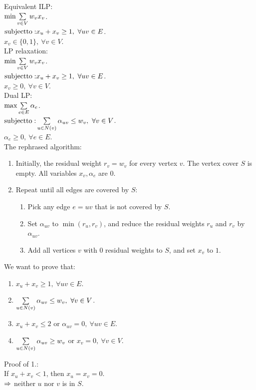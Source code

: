 \begin{pr}$ $\\
Equivalent ILP:\\
$\min\sum\limits_{v\in V}w_vx_v$.\\
$\mathrm{subject to: } x_u+x_v\geq1,\ \forall uv\in E$.\\
$x_v\in\{0, 1\},\ \forall v\in V$.\\
LP relaxation:\\
$\min\sum\limits_{v\in V}w_vx_v$.\\
$\mathrm{subject to: } x_u+x_v\geq1,\ \forall uv\in E$.\\
$x_v\geq0,\ \forall v\in V$.\\
Dual LP:\\
$\max\sum\limits_{e\in E}\alpha_e$.\\
$\subj\suml_{u\in N(v)}\alpha_{uv}\leq w_v,\ \forall v\in V$.\\
$\alpha_e\geq0,\ \forall e\in E$.\\
The rephrased algorithm:
\begin{enumerate}
\item Initially, the residual weight $r_v=w_v$ for every vertex $v$. The vertex cover $S$ is empty. All variables $x_v, \alpha_e$ are $0$.
\item Repeat until all edges are covered by $S$:
\begin{enumerate}
\item Pick any edge $e=uv$ that is not covered by $S$.
\item Set $\alpha_{uv}$ to $\min(r_u, r_v)$, and reduce the residual weights $r_u$ and $r_v$ by $\alpha_{uv}$.
\item Add all vertices $v$ with $0$ residual weights to $S$, and set $x_v$ to $1$.
\end{enumerate}
\end{enumerate}
We want to prove that:
\begin{enumerate}
\item $x_u+x_v\geq1,\ \forall uv\in E$.
\item $\suml_{u\in N(v)}\alpha_{uv}\leq w_v,\ \forall v\in V$.
\item $x_u+x_v\leq2$ or $\alpha_{uv}=0,\ \forall uv\in E$.
\item $\sum\limits_{u\in N(v)}\alpha_{uv}\geq w_v$ or $x_v=0,\ \forall v\in V$.
\end{enumerate}
Proof of 1.:\\
If $x_u+x_v<1$, then $x_u=x_v=0$.\\
$\Rightarrow$ neither $u$ nor $v$ is in $S$.\\

\end{pr}
